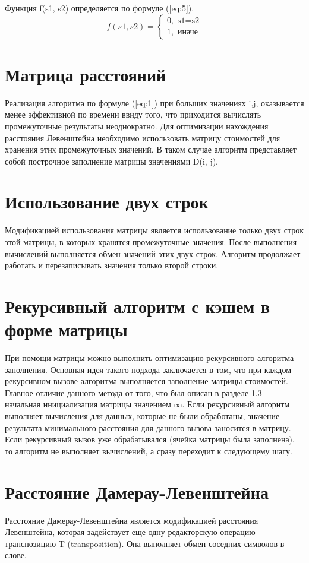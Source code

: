 Функция f(s1, s2) определяется по формуле (\ref{eq:5}).
\begin{equation}
	f(s1, s2) =
	\begin{cases}
		0, \text{  s1=s2}\\
		1, \text{  иначе}
	\end{cases}
	\label{eq:5}
\end{equation}

\section{Матрица расстояний}
Реализация алгоритма по формуле (\ref{eq:1}) при больших значениях i,j, оказывается менее эффективной по времени ввиду того, что приходится вычислять промежуточные результаты неоднократно. Для оптимизации нахождения расстояния Левенштейна необходимо использовать матрицу стоимостей для хранения этих промежуточных значений. В таком случае алгоритм представляет собой построчное заполнение матрицы значениями D(i, j).

\section{Использование двух строк}
Модификацией использования матрицы является использование только двух строк этой матрицы, в которых хранятся промежуточные значения. После выполнения вычислений выполняется обмен значений этих двух строк. Алгоритм продолжает работать и перезаписывать значения только второй строки.

\section{Рекурсивный алгоритм с кэшем в форме матрицы}
При помощи матрицы можно выполнить оптимизацию рекурсивного алгоритма заполнения. Основная идея такого подхода заключается в том, что при каждом рекурсивном вызове алгоритма выполняется заполнение матрицы стоимостей. Главное отличие данного метода от того, что был описан в разделе 1.3 - начальная инициализация матрицы значением $\infty$. Если рекурсивный алгоритм выполняет вычисления для данных, которые не были обработаны, значение результата минимального расстояния для данного вызова заносится в матрицу. Если рекурсивный вызов уже обрабатывался (ячейка матрицы была заполнена), то алгоритм не выполняет вычислений, а сразу переходит к следующему шагу.

\section{Расстояние Дамерау-Левенштейна}
Расстояние Дамерау-Левенштейна является модификацией расстояния Левенштейна, которая задействует еще одну редакторскую операцию - транспозицию T
(transposition). Она выполняет обмен соседних символов в слове.

